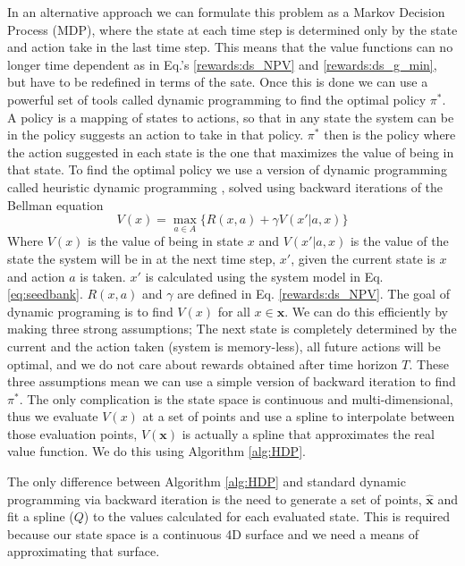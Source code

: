 \documentclass[12pt, a4paper]{article}
\begin{document}
In an alternative approach we can formulate this problem as a Markov Decision Process (MDP), where the state at each time step is determined only by the state and action take in the last time step. This means that the value functions can no longer time dependent as in Eq.'s \ref{rewards:ds_NPV} and \ref{rewards:ds_g_min}, but have to be redefined in terms of the sate. Once this is done we can use a powerful set of tools called dynamic programming to find the optimal policy $\pi^*$. A policy is a mapping of states to actions, so that in any state the system can be in the policy suggests an action to take in that policy. $\pi^*$ then is the policy where the action suggested in each state is the one that maximizes the value of being in that state. To find the optimal policy we use a version of dynamic programming called heuristic dynamic programming \citep{Werb1992}, solved using backward iterations of the Bellman equation 
\begin{equation}\label{eq:bellman}
	V(x) = \max\limits_{a \in A}\lbrace R(x, a) + \gamma V(x'|a, x) \rbrace 
\end{equation}                  
Where $V(x)$ is the value of being in state $x$ and $V(x'|a, x)$ is the value of the state the system will be in at the next time step, $x'$, given the current state is $x$ and action $a$ is taken. $x'$ is calculated using the system model in Eq. \ref{eq:seedbank}. $R(x, a)$ and $\gamma$ are defined in Eq. \ref{rewards:ds_NPV}. The goal of dynamic programing is to find $V(x)$ for all $x \in \mathbf{x}$. We can do this efficiently by making three strong assumptions; The next state is completely determined by the current and the action taken (system is memory-less), all future actions will be optimal, and we do not care about rewards obtained after time horizon $T$. These three assumptions mean we can use a simple version of backward iteration to find $\pi^*$. The only complication is the state space is continuous and multi-dimensional, thus we evaluate $V(x)$ at a set of points and use a spline to interpolate between those evaluation points, $V(\mathbf{x})$ is actually a spline that approximates the real value function. We do this using Algorithm \ref{alg:HDP}.

The only difference between Algorithm \ref{alg:HDP} and standard dynamic programming via backward iteration is the need to generate a set of points, $\hat{\mathbf{x}}$ and fit a spline ($Q$) to the values calculated for each evaluated state. This is required because our state space is a continuous 4D surface and we need a means of approximating that surface.
\end{document}
